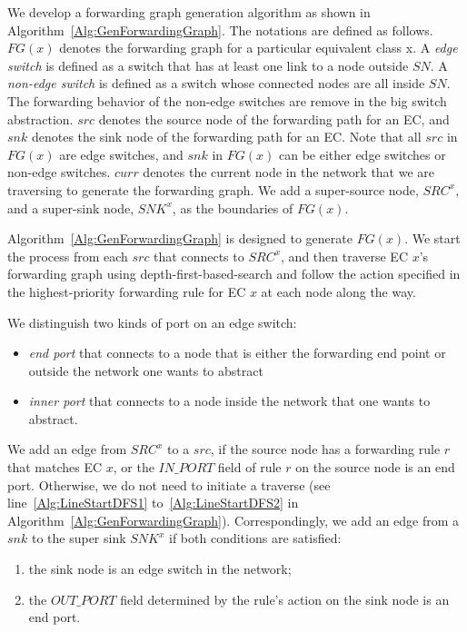 We develop a forwarding graph generation algorithm as shown in Algorithm~\ref{Alg:GenForwardingGraph}.
The notations are defined as follows.
$FG(x)$ denotes the forwarding graph for a particular equivalent class x.
A \textit{edge switch} is defined as a switch that has at least one link to a node outside $SN$.
A \textit{non-edge switch} is defined as a switch whose connected nodes are all inside $SN$.
The forwarding behavior of the non-edge switches are remove in the big switch abstraction.
$src$ denotes the source node of the forwarding path for an EC,
and $snk$ denotes the sink node of the forwarding path for an EC.
Note that all $src$ in $FG(x)$ are edge switches,
and $snk$ in $FG(x)$ can be either edge switches or non-edge switches.
$curr$ denotes the current node in the network that we are traversing to generate the forwarding graph.
We add a super-source node, $SRC^x$, and a super-sink node, $SNK^x$, as the boundaries of $FG(x)$.

Algorithm~\ref{Alg:GenForwardingGraph} is designed to generate $FG(x)$.
We start the process from each $src$ that connects to $SRC^x$,
and then traverse EC $x$'s forwarding graph using depth-first-based-search and
follow the action specified in the highest-priority forwarding rule for EC $x$ at each node along the way. 


We distinguish two kinds of port on an edge switch:
\begin{itemize}
\item \textit{end port} that connects to a node that is either the forwarding end point or outside the network one wants to abstract
\item \textit{inner port} that connects to a node inside the network that one wants to abstract.
\end{itemize}

We add an edge from $SRC^x$ to a $src$, if the source node has a forwarding rule $r$ that matches EC $x$, or the $IN\_PORT$ field of rule $r$ on the source node is an end port. 
Otherwise, we do not need to initiate a traverse (see line~\ref{Alg:LineStartDFS1} to~\ref{Alg:LineStartDFS2} in Algorithm~\ref{Alg:GenForwardingGraph}).
Correspondingly, we add an edge from a $snk$ to the super sink $SNK^x$ if both conditions are satisfied:
\begin{enumerate}
\item the sink node is an edge switch in the network;
\item the $OUT\_PORT$ field determined by the rule's action on the sink node is an end port.
\end{enumerate}

